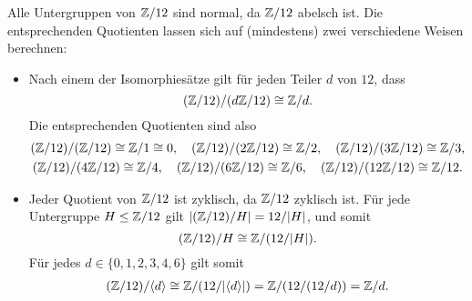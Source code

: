 Alle Untergruppen von $\mathbb{Z}/12$ sind normal, da $\mathbb{Z}/12$ abelsch ist.
Die entsprechenden Quotienten lassen sich auf (mindestens) zwei verschiedene Weisen berechnen:

\begin{itemize}
  \item
    Nach einem der Isomorphiesätze gilt für jeden Teiler $d$ von $12$, dass
    \[
            (\mathbb{Z}/12) / (d\mathbb{Z}/12) \cong \mathbb{Z}/d.
    \]
    Die entsprechenden Quotienten sind also
    \begin{gather*}
      (\mathbb{Z}/12) / (\mathbb{Z}/12)   \cong \mathbb{Z}/1 \cong 0,
      \quad
      (\mathbb{Z}/12) / (2\mathbb{Z}/12)  \cong \mathbb{Z}/2,
      \quad
      (\mathbb{Z}/12) / (3\mathbb{Z}/12)  \cong \mathbb{Z}/3,
    \\
      (\mathbb{Z}/12) / (4\mathbb{Z}/12)  \cong \mathbb{Z}/4,
      \quad
      (\mathbb{Z}/12) / (6\mathbb{Z}/12)  \cong \mathbb{Z}/6,
      \quad
      (\mathbb{Z}/12) / (12\mathbb{Z}/12) \cong \mathbb{Z}/12.
    \end{gather*}
  \item
    Jeder Quotient von $\mathbb{Z}/12$ ist zyklisch, da $\mathbb{Z}/12$ zyklisch ist.
    Für jede Untergruppe $H \leq \mathbb{Z}/12$ gilt $| (\mathbb{Z}/12)/H | = 12/|H|$, und somit
    \[
            (\mathbb{Z}/12)/H
      \cong \mathbb{Z}/( 12/|H| ).
    \]
    Für jedes $d \in \{0, 1, 2, 3, 4, 6\}$ gilt somit
    \begin{gather*}
            (\mathbb{Z}/12)/\langle d\rangle
      \cong \mathbb{Z}/(12/|\langle d\rangle|)
      =     \mathbb{Z}/(12/(12/d))
      =     \mathbb{Z}/d.
    \end{gather*}
\end{itemize}












